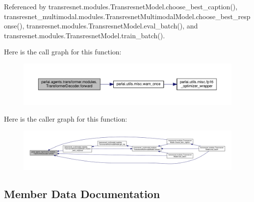 Referenced by transresnet.\+modules.\+Transresnet\+Model.\+choose\+\_\+best\+\_\+caption(), transresnet\+\_\+multimodal.\+modules.\+Transresnet\+Multimodal\+Model.\+choose\+\_\+best\+\_\+response(), transresnet.\+modules.\+Transresnet\+Model.\+eval\+\_\+batch(), and transresnet.\+modules.\+Transresnet\+Model.\+train\+\_\+batch().

Here is the call graph for this function\+:
\nopagebreak
\begin{figure}[H]
\begin{center}
\leavevmode
\includegraphics[width=350pt]{classparlai_1_1agents_1_1transformer_1_1modules_1_1TransformerDecoder_a19b2e9eecef1384bcfa9f772cac24a20_cgraph}
\end{center}
\end{figure}
Here is the caller graph for this function\+:
\nopagebreak
\begin{figure}[H]
\begin{center}
\leavevmode
\includegraphics[width=350pt]{classparlai_1_1agents_1_1transformer_1_1modules_1_1TransformerDecoder_a19b2e9eecef1384bcfa9f772cac24a20_icgraph}
\end{center}
\end{figure}


\subsection{Member Data Documentation}
\mbox{\label{classparlai_1_1agents_1_1transformer_1_1modules_1_1TransformerDecoder_aced85fffc20320f29be295f94e686a63}} 
